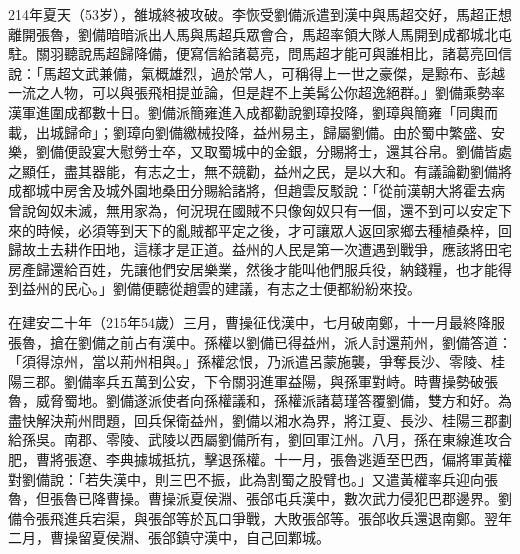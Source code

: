 214年夏天（53岁），雒城終被攻破。李恢受劉備派遣到漢中與馬超交好，馬超正想離開張魯，劉備暗暗派出人馬與馬超兵眾會合，馬超率領大隊人馬開到成都城北屯駐。關羽聽說馬超歸降備，便寫信給諸葛亮，問馬超才能可與誰相比，諸葛亮回信說：「馬超文武兼備，氣概雄烈，過於常人，可稱得上一世之豪傑，是黥布、彭越一流之人物，可以與張飛相提並論，但是趕不上美髯公你超逸絕群。」劉備乘勢率漢軍進圍成都數十日。劉備派簡雍進入成都勸說劉璋投降，劉璋與簡雍「同輿而載，出城歸命」；劉璋向劉備繳械投降，益州易主，歸屬劉備。由於蜀中繁盛、安樂，劉備便設宴大慰勞士卒，又取蜀城中的金銀，分賜將士，還其谷帛。劉備皆處之顯任，盡其器能，有志之士，無不競勸，益州之民，是以大和。有議論勸劉備將成都城中房舍及城外園地桑田分賜給諸將，但趙雲反駁說：「從前漢朝大將霍去病曾說匈奴未滅，無用家為，何況現在國賊不只像匈奴只有一個，還不到可以安定下來的時候，必須等到天下的亂賊都平定之後，才可讓眾人返回家鄉去種植桑梓，回歸故土去耕作田地，這樣才是正道。益州的人民是第一次遭遇到戰爭，應該將田宅房產歸還給百姓，先讓他們安居樂業，然後才能叫他們服兵役，納錢糧，也才能得到益州的民心。」劉備便聽從趙雲的建議，有志之士便都紛紛來投。

在建安二十年（215年54歲）三月，曹操征伐漢中，七月破南鄭，十一月最終降服張魯，搶在劉備之前占有漢中。孫權以劉備已得益州，派人討還荊州，劉備答道：「須得涼州，當以荊州相與。」孫權忿恨，乃派遣呂蒙施襲，爭奪長沙、零陵、桂陽三郡。劉備率兵五萬到公安，下令關羽進軍益陽，與孫軍對峙。時曹操勢破張魯，威脅蜀地。劉備遂派使者向孫權議和，孫權派諸葛瑾答覆劉備，雙方和好。為盡快解決荊州問題，回兵保衛益州，劉備以湘水為界，將江夏、長沙、桂陽三郡劃給孫吳。南郡、零陵、武陵以西屬劉備所有，劉回軍江州。八月，孫在東線進攻合肥，曹將張遼、李典據城抵抗，擊退孫權。十一月，張魯逃遁至巴西，偏將軍黃權對劉備說：「若失漢中，則三巴不振，此為割蜀之股臂也。」又遣黃權率兵迎向張魯，但張魯已降曹操。曹操派夏侯淵、張郃屯兵漢中，數次武力侵犯巴郡邊界。劉備令張飛進兵宕渠，與張郃等於瓦口爭戰，大敗張郃等。張郃收兵還退南鄭。翌年二月，曹操留夏侯淵、張郃鎮守漢中，自己回鄴城。

